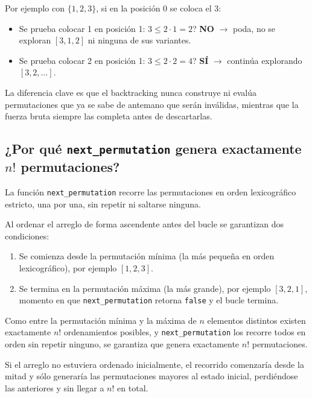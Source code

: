 \documentclass[12pt, a4paper]{article}
\begin{document}
Por ejemplo con $\{1, 2, 3\}$, si en la posición 0 se coloca el 3:
\begin{itemize}
  \item Se prueba colocar 1 en posición 1: $3 \leq 2 \cdot 1 = 2$? \textbf{NO}
        $\rightarrow$ poda, no se exploran $[3, 1, 2]$ ni ninguna de sus variantes.
  \item Se prueba colocar 2 en posición 1: $3 \leq 2 \cdot 2 = 4$? \textbf{SÍ}
        $\rightarrow$ continúa explorando $[3, 2, \ldots]$.
\end{itemize}

La diferencia clave es que el backtracking nunca construye ni evalúa permutaciones
que ya se sabe de antemano que serán inválidas, mientras que la fuerza bruta siempre
las completa antes de descartarlas.

\subsection{¿Por qué \texttt{next\_permutation} genera exactamente $n!$ permutaciones?}

La función \texttt{next\_permutation} recorre las permutaciones en orden lexicográfico
estricto, una por una, sin repetir ni saltarse ninguna.

Al ordenar el arreglo de forma ascendente antes del bucle se garantizan dos condiciones:

\begin{enumerate}
  \item Se comienza desde la permutación mínima (la más pequeña en orden lexicográfico),
        por ejemplo $[1, 2, 3]$.
  \item Se termina en la permutación máxima (la más grande), por ejemplo $[3, 2, 1]$,
        momento en que \texttt{next\_permutation} retorna \texttt{false} y el bucle termina.
\end{enumerate}

Como entre la permutación mínima y la máxima de $n$ elementos distintos existen
exactamente $n!$ ordenamientos posibles, y \texttt{next\_permutation} los recorre todos
en orden sin repetir ninguno, se garantiza que genera exactamente $n!$ permutaciones.

Si el arreglo no estuviera ordenado inicialmente, el recorrido comenzaría desde la
mitad y sólo generaría las permutaciones mayores al estado inicial, perdiéndose las
anteriores y sin llegar a $n!$ en total.

\end{document}
